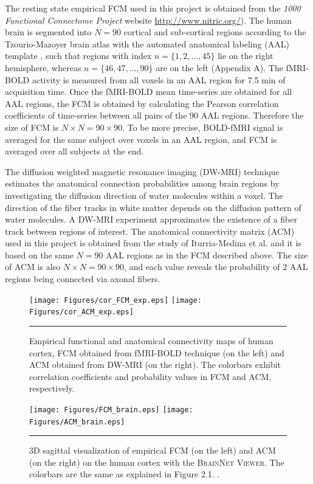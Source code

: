 The resting state empirical FCM used in this project is obtained from the \textit{1000 Functional Connectome Project} website \url{http://www.nitric.org/}). The human brain is segmented into $N=90$ cortical and sub-cortical regions according to the Tzourio-Mazoyer brain atlas with the automated anatomical labeling (AAL) template  \citep{TZO02}, such that regions with index $n=\{1,2,...,45\}$ lie on the right hemisphere, whereas $n=\{46,47,...,90\}$ are on the left (Appendix A). The fMRI-BOLD activity is measured from all voxels in an AAL region for 7.5 min of acquisition time. Once the fMRI-BOLD mean time-series are obtained for all AAL regions, the FCM is obtained by calculating the Pearson correlation coefficients of time-series between all pairs of the 90 AAL regions. Therefore the size of FCM is $N\times N = 90 \times 90$.  To be more precise, BOLD-fMRI signal is averaged for the same subject over voxels in an AAL region, and FCM is averaged over all subjects at the end. 

The diffusion weighted magnetic resonance imaging (DW-MRI) technique estimates the anatomical connection probabilities among brain regions by investigating the diffusion direction of water molecules within a voxel. The direction of the fiber tracks in white matter depends on the diffusion pattern of water molecules. A DW-MRI experiment approximates the existence of a fiber track between regions of interest. The anatomical connectivity matrix (ACM) used in this project is obtained from the study of Iturria-Medina et al. \citep{ITU08} and it is based on the same $N=90$ AAL regions as in the FCM described above. The size of ACM is also $N\times N = 90\times 90$, and each value reveals the probability of 2 AAL regions being connected via axonal fibers. 
  
\begin{figure}[htbp]
 
  \centering
	 \texttt{[image: Figures/cor\_FCM\_exp.eps]} 
	 \texttt{[image: Figures/cor\_ACM\_exp.eps]} 
	
    \rule{35em}{0.5pt}
  \caption[Empirical FCM and ACM]{Empirical functional and anatomical connectivity maps of human cortex, FCM obtained from fMRI-BOLD technique (on the left) and ACM obtained from DW-MRI (on the right). The colorbars exhibit correlation coefficients and probability values in FCM and ACM, respectively. }
  \label{fig:Empirical FCM and ACM}
 	
\end{figure}  

 
\begin{figure}[htbp]
 
  \centering
	 \texttt{[image: Figures/FCM\_brain.eps]} 
	 \texttt{[image: Figures/ACM\_brain.eps]} 
    \rule{35em}{0.5pt}
  \caption[Empirical FCM and ACM in Cortex]{3D sagittal visualization of empirical FCM (on the left) and ACM (on the right) on the human cortex with the \textsc{BrainNet Viewer}. The colorbars are the same as explained in Figure 2.1. \citep{XYZ13}. } 
  \label{fig:Empirical FCM and ACM in Cortex}
 	
\end{figure} 

